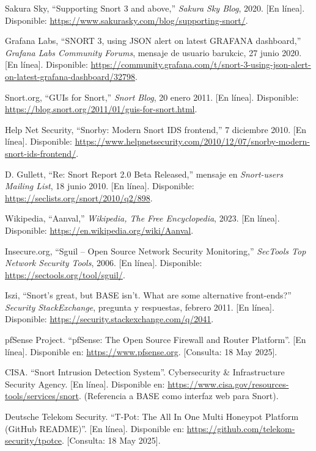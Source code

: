 \documentclass[11pt,a4paper,twoside]{report}
\begin{document}
\begin{thebibliography}{99}
	 Sakura Sky, “Supporting Snort 3 and above,” \textit{Sakura Sky Blog}, 2020. [En línea]. Disponible: \url{https://www.sakurasky.com/blog/supporting-snort/}.
	
	 Grafana Labs, “SNORT 3, using JSON alert on latest GRAFANA dashboard,” \textit{Grafana Labs Community Forums}, mensaje de usuario barukcic, 27 junio 2020. [En línea]. Disponible: \url{https://community.grafana.com/t/snort-3-using-json-alert-on-latest-grafana-dashboard/32798}.
	
	 Snort.org, “GUIs for Snort,” \textit{Snort Blog}, 20 enero 2011. [En línea]. Disponible: \url{https://blog.snort.org/2011/01/guis-for-snort.html}.
	
	 Help Net Security, “Snorby: Modern Snort IDS frontend,” 7 diciembre 2010. [En línea]. Disponible: \url{https://www.helpnetsecurity.com/2010/12/07/snorby-modern-snort-ids-frontend/}.
	
	 D. Gullett, “Re: Snort Report 2.0 Beta Released,” mensaje en \textit{Snort-users Mailing List}, 18 junio 2010. [En línea]. Disponible: \url{https://seclists.org/snort/2010/q2/898}.
	
	 Wikipedia, “Aanval,” \textit{Wikipedia, The Free Encyclopedia}, 2023. [En línea]. Disponible: \url{https://en.wikipedia.org/wiki/Aanval}.
	
	 Insecure.org, “Sguil – Open Source Network Security Monitoring,” \textit{SecTools Top Network Security Tools}, 2006. [En línea]. Disponible: \url{https://sectools.org/tool/sguil/}.
	
	 Iszi, “Snort’s great, but BASE isn’t. What are some alternative front-ends?” \textit{Security StackExchange}, pregunta y respuestas, febrero 2011. [En línea]. Disponible: \url{https://security.stackexchange.com/q/2041}.
	
	 pfSense Project. ``pfSense: The Open Source Firewall and Router Platform''. [En línea]. Disponible en: \url{https://www.pfsense.org}. [Consulta: 18 May 2025].
	
	 CISA. ``Snort Intrusion Detection System''. Cybersecurity \& Infrastructure Security Agency. [En línea]. Disponible en: \url{https://www.cisa.gov/resources-tools/services/snort}. (Referencia a BASE como interfaz web para Snort).
	
	 Deutsche Telekom Security. ``T-Pot: The All In One Multi Honeypot Platform (GitHub README)''. [En línea]. Disponible en: \url{https://github.com/telekom-security/tpotce}. [Consulta: 18 May 2025].
	

\end{thebibliography}
\end{document}
